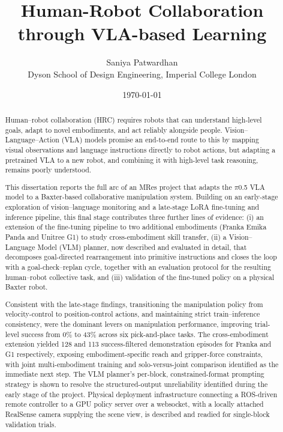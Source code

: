 \documentclass[12pt]{article}
\begin{document}
\newcommand{\reporttitle}{Human-Robot Collaboration through VLA-based Learning}
\newcommand{\reportauthor}{Saniya Patwardhan}
\newcommand{\reporttype}{MRes Final Dissertation}
\newcommand{\cid}{06059013}
\date{\today}



\title{Human-Robot Collaboration through VLA-based Learning}
\author{Saniya Patwardhan \\ Dyson School of Design Engineering, Imperial College London}
\maketitle

\begin{abstract}
Human--robot collaboration (HRC) requires robots that can understand high-level goals, adapt to novel embodiments, and act reliably alongside people. Vision--Language--Action (VLA) models promise an end-to-end route to this by mapping visual observations and language instructions directly to robot actions, but adapting a pretrained VLA to a new robot, and combining it with high-level task reasoning, remains poorly understood.

This dissertation reports the full arc of an MRes project that adapts the $\pi$0.5 VLA model to a Baxter-based collaborative manipulation system. Building on an early-stage exploration of vision--language monitoring and a late-stage LoRA fine-tuning and inference pipeline, this final stage contributes three further lines of evidence: (i) an extension of the fine-tuning pipeline to two additional embodiments (Franka Emika Panda and Unitree G1) to study cross-embodiment skill transfer, (ii) a Vision--Language Model (VLM) planner, now described and evaluated in detail, that decomposes goal-directed rearrangement into primitive instructions and closes the loop with a goal-check--replan cycle, together with an evaluation protocol for the resulting human--robot collective task, and (iii) validation of the fine-tuned policy on a physical Baxter robot.

Consistent with the late-stage findings, transitioning the manipulation policy from velocity-control to position-control actions, and maintaining strict train--inference consistency, were the dominant levers on manipulation performance, improving trial-level success from 0\% to 43\% across six pick-and-place tasks. The cross-embodiment extension yielded 128 and 113 success-filtered demonstration episodes for Franka and G1 respectively, exposing embodiment-specific reach and gripper-force constraints, with joint multi-embodiment training and solo-versus-joint comparison identified as the immediate next step. The VLM planner's per-block, constrained-format prompting strategy is shown to resolve the structured-output unreliability identified during the early stage of the project. Physical deployment infrastructure connecting a ROS-driven remote controller to a GPU policy server over a websocket, with a locally attached RealSense camera supplying the scene view, is described and readied for single-block validation trials.


\end{abstract}
\end{document}
